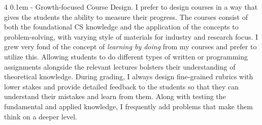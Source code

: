 \documentclass[9pt]{article}
\makeatletter
\def \paragraph {%
    \@startsection{paragraph}%
        {4}%
        \z@%
        {0.1em}
        {-\fontdimen 6 \font}%
        {\normalfont \bfseries}%
    }
\makeatother
\begin{document}
\paragraph{Growth-focused Course Design.}
I prefer to design courses in a way that gives the students the ability to measure their progress. 
%
The courses consist of both the foundational CS knowledge and the application of the concepts to problem-solving, with varying style of materials for industry and research focus.
%
I grew very fond of the concept of \textit{learning by doing} from my courses and prefer to utilize this. Allowing students to do different types of written or programming assignments alongside the relevant lectures bolsters their understanding of theoretical knowledge.
%
%
During grading, I always design fine-grained rubrics with lower stakes and provide detailed feedback to the students so that they can understand their mistakes and learn from them. Along with testing the fundamental and applied knowledge,
I frequently add problems that make them think on a deeper level. 
\end{document}
